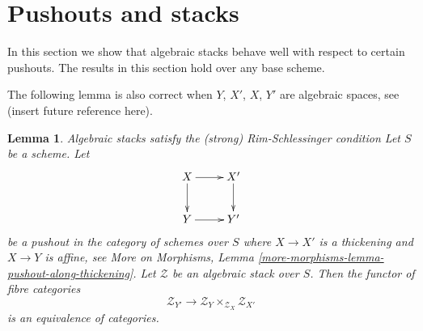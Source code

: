 \documentclass{stacks-project}
\newenvironment{slogan}{\comment}{\endcomment}
\theoremstyle{plain}
\newtheorem{lemma}[subsection]{Lemma}
\theoremstyle{definition}
\theoremstyle{remark}
\numberwithin{equation}{subsection}
\begin{document}
\section{Pushouts and stacks}
\label{section-pushouts}

\noindent
In this section we show that algebraic stacks behave well with
respect to certain pushouts. The results in this section hold over
any base scheme.

\medskip\noindent
The following lemma is also correct when $Y$, $X'$, $X$, $Y'$ are
algebraic spaces, see (insert future reference here).

\begin{lemma}
\label{lemma-pushout}
\begin{slogan}
Algebraic stacks satisfy the (strong) Rim-Schlessinger condition
\end{slogan}
Let $S$ be a scheme. Let
$$
\xymatrix{
X \ar[r] \ar[d] & X' \ar[d] \\
Y \ar[r] & Y'
}
$$
be a pushout in the category of schemes over $S$ where $X \to X'$
is a thickening and $X \to Y$ is affine, see
More on Morphisms, Lemma \ref{more-morphisms-lemma-pushout-along-thickening}.
Let $\mathcal{Z}$ be an algebraic stack over $S$.
Then the functor of fibre categories
$$
\mathcal{Z}_{Y'}
\longrightarrow
\mathcal{Z}_Y \times_{\mathcal{Z}_X} \mathcal{Z}_{X'}
$$
is an equivalence of categories.
\end{lemma}
\end{document}
